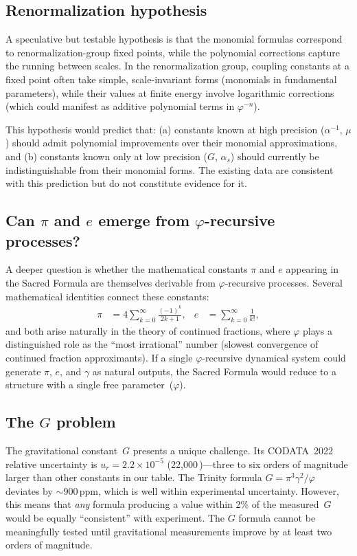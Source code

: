 \documentclass[11pt,a4paper]{article}
\newcommand{\vp}{\varphi}
\newcommand{\ppm}{\,\mathrm{ppm}}
\begin{document}
\subsection{Renormalization hypothesis}

A speculative but testable hypothesis is that the monomial formulas correspond
to renormalization-group fixed points, while the polynomial corrections capture
the running between scales. In the renormalization group, coupling constants at
a fixed point often take simple, scale-invariant forms (monomials in fundamental
parameters), while their values at finite energy involve logarithmic corrections
(which could manifest as additive polynomial terms in $\vp^{-n}$).

This hypothesis would predict that: (a) constants known at high precision
($\alpha^{-1}$, $\mu$) should admit polynomial improvements over their monomial
approximations, and (b) constants known only at low precision ($G$,
$\alpha_s$) should currently be indistinguishable from their monomial
forms. The existing data are consistent with this prediction but do not
constitute evidence for it.

\subsection{Can $\pi$ and $e$ emerge from $\vp$-recursive processes?}

A deeper question is whether the mathematical constants $\pi$ and $e$
appearing in the Sacred Formula are themselves derivable from
$\vp$-recursive processes. Several mathematical identities connect these
constants:
\begin{align}
  \pi &= 4\sum_{k=0}^{\infty}\frac{(-1)^{k}}{2k+1}, &
  e &= \sum_{k=0}^{\infty}\frac{1}{k!},
\end{align}
and both arise naturally in the theory of continued fractions, where $\vp$
plays a distinguished role as the ``most irrational'' number (slowest
convergence of continued fraction approximants). If a single
$\vp$-recursive dynamical system could generate $\pi$, $e$, and $\gamma$
as natural outputs, the Sacred Formula would reduce to a structure with a
single free parameter~($\vp$).

\subsection{The $G$ problem}

The gravitational constant~$G$ presents a unique challenge. Its CODATA~2022
relative uncertainty is $u_r = 2.2\times 10^{-5}$ (22{,}000\ppm)---three to
six orders of magnitude larger than other constants in our table. The
Trinity formula $G=\pi^{3}\gamma^{2}/\vp$ deviates by $\sim 900\ppm$, which
is well within experimental uncertainty. However, this means that
\emph{any} formula producing a value within 2\% of the measured~$G$ would
be equally ``consistent'' with experiment. The $G$ formula cannot be
meaningfully tested until gravitational measurements improve by at least two
orders of magnitude.
\end{document}
